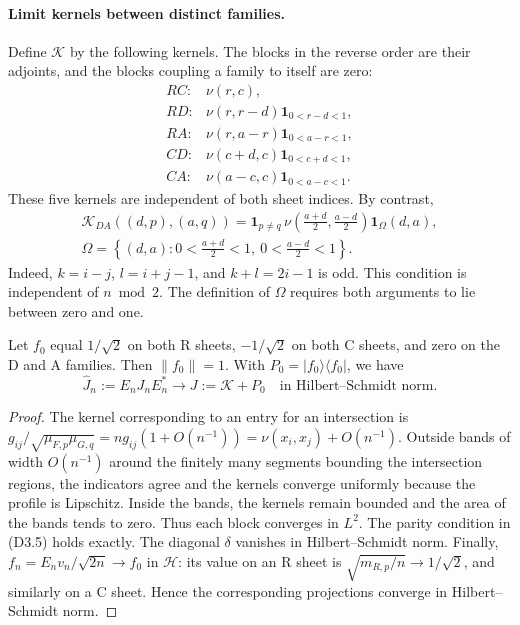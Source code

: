 \paragraph{Limit kernels between distinct families.}
Define $\mathcal K$ by the following kernels. The blocks in the reverse order are
their adjoints, and the blocks coupling a family to itself are zero:
\[
\begin{array}{ll}
 RC:&\nu(r,c),\\
 RD:&\nu(r,r-d)\mathbf1_{0<r-d<1},\\
 RA:&\nu(r,a-r)\mathbf1_{0<a-r<1},\\
 CD:&\nu(c+d,c)\mathbf1_{0<c+d<1},\\
 CA:&\nu(a-c,c)\mathbf1_{0<a-c<1}.
\end{array}                                             \tag{D3.4}
\]
These five kernels are independent of both sheet indices.
By contrast,
\[
 \begin{gathered}
 \mathcal K_{DA}((d,p),(a,q))
 =\mathbf1_{p\ne q}\,
   \nu\left(\frac{a+d}{2},\frac{a-d}{2}\right)\mathbf1_\Omega(d,a),\\
 \Omega=\left\{(d,a):0<\frac{a+d}{2}<1,\ 0<\frac{a-d}{2}<1\right\}.
 \end{gathered}                                         \tag{D3.5}
\]
Indeed, $k=i-j$, $l=i+j-1$, and $k+l=2i-1$ is odd.
This condition is independent of $n\bmod2$.
The definition of $\Omega$ requires both arguments to lie between zero and one.

\begin{proposicion}
Let $f_0$ equal $1/\sqrt2$ on both R sheets, $-1/\sqrt2$ on
both C sheets, and zero on the D and A families. Then $\|f_0\|=1$.
With $P_0=|f_0\rangle\langle f_0|$, we have
\[
 \widehat J_n:=E_nJ_nE_n^*\longrightarrow
             J:=\mathcal K+P_0\quad\text{in Hilbert--Schmidt norm}.       \tag{D3.6}
\]
\end{proposicion}
\begin{proof}
The kernel corresponding to an entry for an intersection is
$g_{ij}/\sqrt{\mu_{F,p}\mu_{G,q}}=ng_{ij}(1+O(n^{-1}))
=\nu(x_i,x_j)+O(n^{-1})$.
Outside bands of width $O(n^{-1})$ around the finitely many segments
bounding the intersection regions, the indicators agree
and the kernels converge uniformly because the profile is Lipschitz.
Inside the bands, the kernels remain bounded and the area of the bands tends to zero.
Thus each block converges in $L^2$. The parity condition in (D3.5) holds exactly.
The diagonal $\delta$ vanishes in Hilbert--Schmidt norm.
Finally, $f_n=E_nv_n/\sqrt{2n}\to f_0$ in $\mathcal H$:
its value on an R sheet is $\sqrt{m_{R,p}/n}\to1/\sqrt2$,
and similarly on a C sheet. Hence the corresponding projections converge in Hilbert--Schmidt norm.
\end{proof}

